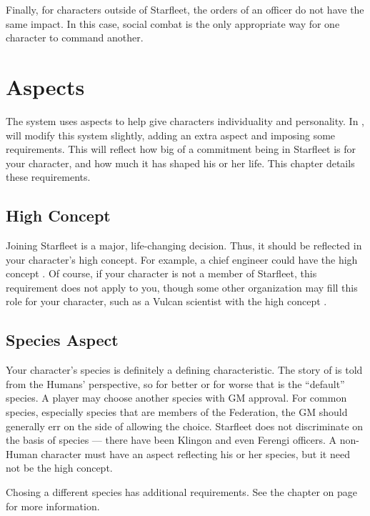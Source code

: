 \documentclass[12pt,titlepage,openany]{book}
\begin{document}
Finally, for characters outside of Starfleet, the orders of an officer do not
have the same impact. In this case, social combat is the only appropriate way
for one character to command another.



\chapter{Aspects}\label{chap:aspects}

The \FateCore{} system uses aspects to help give characters individuality and
personality. In \StarTrekFate{}, will modify this system slightly, adding an
extra aspect and imposing some requirements. This will reflect how big of a
commitment being in Starfleet is for your character, and how much it has shaped
his or her life. This chapter details these requirements.

\section{High Concept}\label{sec:high-concept}
Joining Starfleet is a major, life-changing decision. Thus, it should be
reflected in your character's high concept. For example, a chief engineer could
have the high concept . Of course, if your character
is not a member of Starfleet, this requirement does not apply to you, though
some other organization may fill this role for your character, such as a Vulcan
scientist with the high concept .

\section{Species Aspect}\label{sec:species}
Your character's species is definitely a defining characteristic. The story of
\StarTrek{} is told from the Humans' perspective, so for better or for worse
that is the ``default'' species. A player may choose another species with GM
approval. For common species, especially species that are members of the
Federation, the GM should generally err on the side of allowing the choice.
Starfleet does not discriminate on the basis of species --- there have been
Klingon and even Ferengi officers. A non-Human character must have an aspect
reflecting his or her species, but it need not be the high concept.

Chosing a different species has additional requirements. See the chapter
 on page~\pageref{chap:species} for more information.
\end{document}

